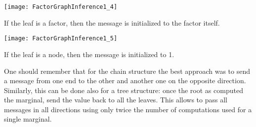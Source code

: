 \begin{center}
  \begin{minipage}[htp]{\linewidth}
    \begin{minipage}[t]{0.48\linewidth}
      \begin{center}
        \texttt{[image: FactorGraphInference1\_4]}\\
      \end{center}
      If the leaf is a factor, then the message is initialized to the factor itself.
    \end{minipage}
    \hspace{0.02\linewidth}
    \begin{minipage}[t]{0.48\linewidth}
      \begin{center}
        \texttt{[image: FactorGraphInference1\_5]}\\
      \end{center}
      If the leaf is a node, then the message is initialized to 1.
    \end{minipage}
  \end{minipage}
\end{center}
One should remember that for the chain structure the best approach was to send a message from one end to the other and another one on the opposite direction. Similarly, this can be done also for a tree structure: once the root as computed the marginal, send the value back to all the leaves. This allows to pass all messages in all directions using only twice the number of computations used for a single marginal. 
%
